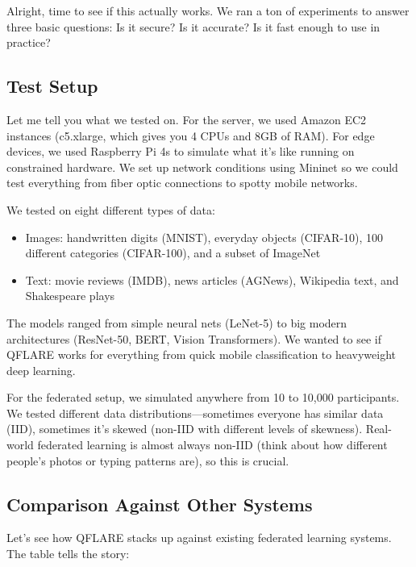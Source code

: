 \documentclass[onecolumn,11pt]{article}
\begin{document}
Alright, time to see if this actually works. We ran a ton of experiments to answer three basic questions: Is it secure? Is it accurate? Is it fast enough to use in practice?

\subsection{Test Setup}

Let me tell you what we tested on. For the server, we used Amazon EC2 instances (c5.xlarge, which gives you 4 CPUs and 8GB of RAM). For edge devices, we used Raspberry Pi 4s to simulate what it's like running on constrained hardware. We set up network conditions using Mininet so we could test everything from fiber optic connections to spotty mobile networks.

We tested on eight different types of data:
\begin{itemize}
\item Images: handwritten digits (MNIST), everyday objects (CIFAR-10), 100 different categories (CIFAR-100), and a subset of ImageNet
\item Text: movie reviews (IMDB), news articles (AGNews), Wikipedia text, and Shakespeare plays
\end{itemize}

The models ranged from simple neural nets (LeNet-5) to big modern architectures (ResNet-50, BERT, Vision Transformers). We wanted to see if QFLARE works for everything from quick mobile classification to heavyweight deep learning.

For the federated setup, we simulated anywhere from 10 to 10,000 participants. We tested different data distributions—sometimes everyone has similar data (IID), sometimes it's skewed (non-IID with different levels of skewness). Real-world federated learning is almost always non-IID (think about how different people's photos or typing patterns are), so this is crucial.

\subsection{Comparison Against Other Systems}

Let's see how QFLARE stacks up against existing federated learning systems. The table tells the story:
\end{document}
